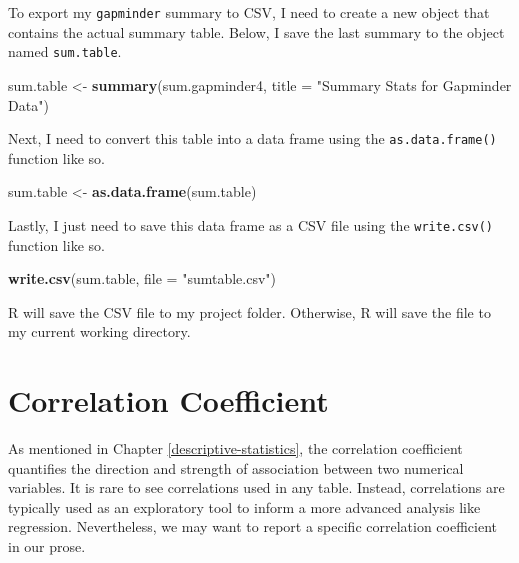 \documentclass[
]{book}
\makeatletter
\newenvironment{Shaded}{\begin{snugshade}}{\end{snugshade}}
\newcommand{\AttributeTok}[1]{\textcolor[rgb]{0.27,0.27,0.27}{#1}}
\newcommand{\FunctionTok}[1]{\textcolor[rgb]{0.27,0.27,0.27}{\textbf{#1}}}
\newcommand{\NormalTok}[1]{#1}
\newcommand{\OtherTok}[1]{\textcolor[rgb]{0.37,0.37,0.37}{#1}}
\newcommand{\StringTok}[1]{\textcolor[rgb]{0.5,0.5,0.5}{#1}}
\newenvironment{kframe}{%
\medskip{}
\setlength{\fboxsep}{.8em}
 \def\at@end@of@kframe{}%
 \ifinner\ifhmode%
  \def\at@end@of@kframe{\end{minipage}}%
  \begin{minipage}{\columnwidth}%
 \fi\fi%
 \def\FrameCommand##1{\hskip\@totalleftmargin \hskip-\fboxsep
 \colorbox{shadecolor}{##1}\hskip-\fboxsep
     \hskip-\linewidth \hskip-\@totalleftmargin \hskip\columnwidth}%
 \MakeFramed {\advance\hsize-\width
   \@totalleftmargin\z@ \linewidth\hsize
   \@setminipage}}%
 {\par\unskip\endMakeFramed%
 \at@end@of@kframe}
\renewenvironment{Shaded}{\begin{kframe}}{\end{kframe}}
\makeatother
\begin{document}
To export my \texttt{gapminder} summary to CSV, I need to create a new object that contains the actual summary table. Below, I save the last summary to the object named \texttt{sum.table}.

\begin{Shaded}
\begin{Highlighting}[]
\NormalTok{sum.table }\OtherTok{\textless{}{-}} \FunctionTok{summary}\NormalTok{(sum.gapminder4, }\AttributeTok{title =} \StringTok{"Summary Stats for Gapminder Data"}\NormalTok{)}
\end{Highlighting}
\end{Shaded}

Next, I need to convert this table into a data frame using the \texttt{as.data.frame()} function like so.

\begin{Shaded}
\begin{Highlighting}[]
\NormalTok{sum.table }\OtherTok{\textless{}{-}} \FunctionTok{as.data.frame}\NormalTok{(sum.table)}
\end{Highlighting}
\end{Shaded}

Lastly, I just need to save this data frame as a CSV file using the \texttt{write.csv()} function like so.

\begin{Shaded}
\begin{Highlighting}[]
\FunctionTok{write.csv}\NormalTok{(sum.table, }\AttributeTok{file =} \StringTok{"sumtable.csv"}\NormalTok{)}
\end{Highlighting}
\end{Shaded}

R will save the CSV file to my project folder. Otherwise, R will save the file to my current working directory.

\hypertarget{correlation-coefficient}{%
\section{Correlation Coefficient}\label{correlation-coefficient}}

As mentioned in Chapter \ref{descriptive-statistics}, the correlation coefficient quantifies the direction and strength of association between two numerical variables. It is rare to see correlations used in any table. Instead, correlations are typically used as an exploratory tool to inform a more advanced analysis like regression. Nevertheless, we may want to report a specific correlation coefficient in our prose.
\end{document}
